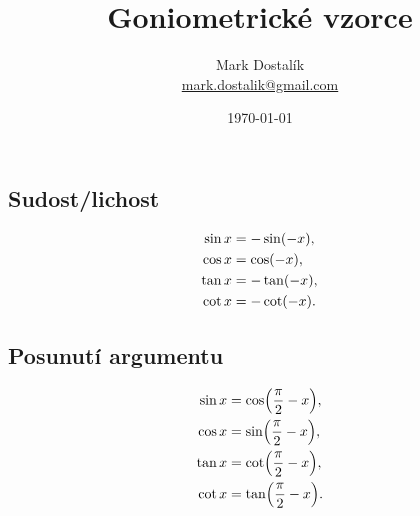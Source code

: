 \documentclass[columns=2]{cheatsheet}
\title{Goniometrické vzorce}
\author{Mark Dostal\'{i}k \\ \href{mailto:mark.dostalik@gmail.com}{mark.dostalik@gmail.com}}
\date{\today}
\begin{document}
\maketitle
\subsection{Sudost/lichost}
\begin{align*}
  \sin x 
  &= 
  - \sin \parens{-x},
  \\
  \cos x
  &=
  \cos \parens{-x},
  \\
  \tan x
  &=
  - \tan \parens{-x},
  \\
  \cot x
  &=
  - \cot \parens{-x}.
\end{align*}

\subsection{Posunutí argumentu}
\begin{align*}
  \sin x 
  &= 
  \cos \parens{\frac{\pi}{2} - x},
  \\
  \cos x
  &=
  \sin \parens{\frac{\pi}{2} - x},
  \\
  \tan x
  &=
  \cot \parens{\frac{\pi}{2} - x},
  \\
  \cot x
  &=
  \tan \parens{\frac{\pi}{2} - x}.
\end{align*}
\end{document}
